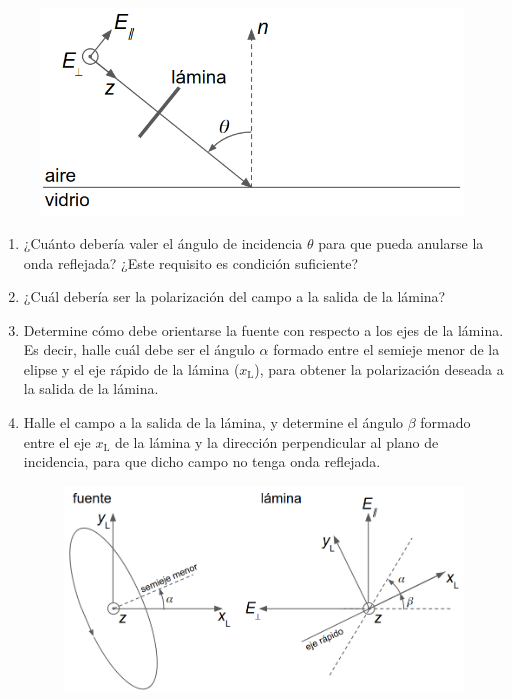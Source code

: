 \documentclass[11pt,spanish]{article}
\begin{document}
\begin{enumerate}
    \begin{figure}[H]
        \centering{}
        \includegraphics[clip,scale=0.45]{figs/brewster1.png}
    \end{figure}
    
    \begin{enumerate}
        \item ¿Cuánto debería valer el ángulo de incidencia $\theta$ para que
        pueda anularse la  onda reflejada? ¿Este requisito es condición
        suficiente?
        
        \item ¿Cuál debería ser la polarización del campo a la salida de la
        lámina?

        \item Determine cómo debe orientarse la fuente con respecto a los ejes
        de la lámina. Es decir, halle cuál debe ser el ángulo $\alpha$ formado
        entre el semieje menor de la elipse y el eje rápido de la lámina
        ($x_\text{L}$), para obtener la polarización deseada a la salida de la
        lámina.
        
        \item Halle el campo a la salida de la lámina, y determine el ángulo
        $\beta$ formado entre el eje $x_\text{L}$ de la lámina y la dirección
        perpendicular al plano de incidencia, para que dicho campo no tenga onda
        reflejada.
        
        \begin{figure}[H]
            \centering{}
            \includegraphics[clip,scale=0.45]{figs/brewster2.png}
        \end{figure}


\end{enumerate}
\end{enumerate}
\end{document}
